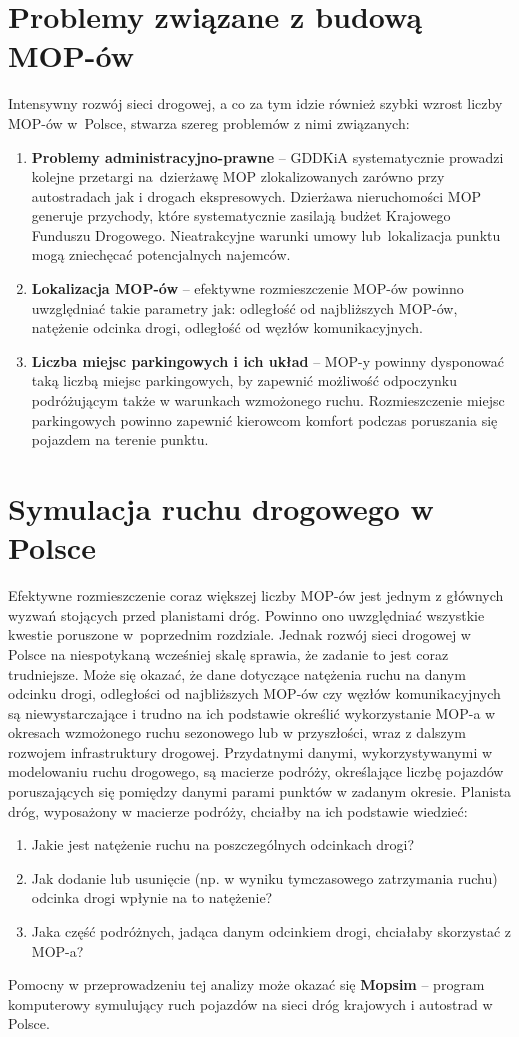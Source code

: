 \section{Problemy związane z budową MOP-ów}
Intensywny rozwój sieci drogowej, a co za tym idzie również szybki wzrost liczby MOP-ów w~Polsce, stwarza szereg problemów z nimi związanych:
\begin{enumerate}
    \item \textbf{Problemy administracyjno-prawne} -- GDDKiA systematycznie prowadzi kolejne przetargi na~dzierżawę MOP zlokalizowanych zarówno przy autostradach jak i drogach ekspresowych. Dzierżawa nieruchomości MOP generuje przychody, które systematycznie zasilają budżet Krajowego Funduszu Drogowego. Nieatrakcyjne warunki umowy lub~lokalizacja punktu mogą zniechęcać potencjalnych najemców.
    \item \textbf{Lokalizacja MOP-ów} -- efektywne rozmieszczenie MOP-ów powinno uwzględniać takie parametry jak: odległość od najbliższych MOP-ów, natężenie odcinka drogi, odległość od węzłów komunikacyjnych.
    \item \textbf{Liczba miejsc parkingowych i ich układ} -- MOP-y powinny dysponować taką liczbą miejsc parkingowych, by zapewnić możliwość odpoczynku podróżującym także w warunkach wzmożonego ruchu. Rozmieszczenie miejsc parkingowych powinno zapewnić kierowcom komfort podczas poruszania się pojazdem na terenie punktu.
\end{enumerate}

\section{Symulacja ruchu drogowego w Polsce}
Efektywne rozmieszczenie coraz większej liczby MOP-ów jest jednym z głównych wyzwań stojących przed planistami dróg. Powinno ono uwzględniać wszystkie kwestie poruszone w~poprzednim rozdziale. Jednak rozwój sieci drogowej w Polsce na niespotykaną wcześniej skalę sprawia, że zadanie to jest coraz trudniejsze. Może się okazać, że dane dotyczące natężenia ruchu na danym odcinku drogi, odległości od najbliższych MOP-ów czy węzłów komunikacyjnych są niewystarczające i trudno na ich podstawie określić wykorzystanie MOP-a w okresach wzmożonego ruchu sezonowego lub w przyszłości, wraz z dalszym rozwojem infrastruktury drogowej. Przydatnymi danymi, wykorzystywanymi w modelowaniu ruchu drogowego, są macierze podróży, określające liczbę pojazdów poruszających się pomiędzy danymi parami punktów w zadanym okresie. Planista dróg, wyposażony w macierze podróży, chciałby na ich podstawie wiedzieć:
\begin{enumerate}
	\item Jakie jest natężenie ruchu na poszczególnych odcinkach drogi?
	\item Jak dodanie lub usunięcie (np. w wyniku tymczasowego zatrzymania ruchu) odcinka drogi wpłynie na to natężenie?
	\item Jaka część podróżnych, jadąca danym odcinkiem drogi, chciałaby skorzystać z MOP-a?
\end{enumerate}
Pomocny w przeprowadzeniu tej analizy może okazać się \textbf{Mopsim} -- program komputerowy symulujący ruch pojazdów na
sieci dróg krajowych i autostrad w Polsce.


